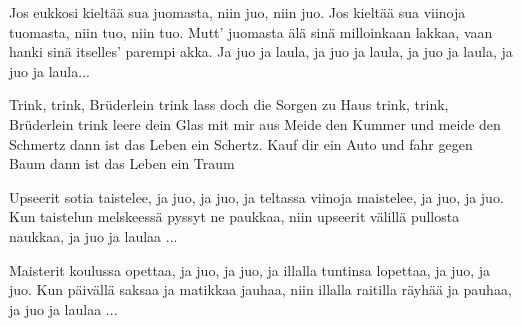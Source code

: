 
  
\beginverse*
Jos eukkosi kieltää sua juomasta,
niin juo, niin juo.
Jos kieltää sua viinoja tuomasta,
niin tuo, niin tuo.
Mutt' juomasta älä sinä milloinkaan lakkaa,
vaan hanki sinä itselles' parempi akka.
Ja juo ja laula, ja juo ja laula,
ja juo ja laula, ja juo ja laula...
\endverse

\beginchorus
Trink, trink, Brüderlein trink
lass doch die Sorgen zu Haus
trink, trink, Brüderlein trink
leere dein Glas mit mir aus
Meide den Kummer und meide den Schmertz
dann ist das Leben ein Schertz.
Kauf dir ein Auto und fahr gegen Baum
dann ist das Leben ein Traum
\endchorus

\beginverse*
Upseerit sotia taistelee,
ja juo, ja juo,
ja teltassa viinoja maistelee,
ja juo, ja juo.
Kun taistelun melskeessä pyssyt ne paukkaa,
niin upseerit välillä pullosta naukkaa,
ja juo ja laulaa ...
\endverse

\beginverse*
Maisterit koulussa opettaa,
ja juo, ja juo,
ja illalla tuntinsa lopettaa,
ja juo, ja juo.
Kun päivällä saksaa ja matikkaa jauhaa,
niin illalla raitilla räyhää ja pauhaa,
ja juo ja laulaa ...
\endverse
\endsong
